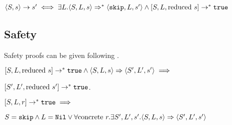 \begin{theorem}
$\langle S, s \rangle \to s' \iff \exists L. \langle S, L, s \rangle \Rightarrow ^{*} \langle \texttt{skip}, L, s' \rangle \land [ S, L, \text{reduced } s ] \to^{*} \texttt{true}$ 
\end{theorem}

\subsection{Safety}

Safety proofs can be given following \cite{wright1994syntactic}.

\begin{theorem}[Preservation]
$[ S, L, \text{reduced } s ] \to ^* \texttt{true} \land \langle S, L, s \rangle \Rightarrow \langle S', L', s' \rangle \implies$ 

$[ S', L', \text{reduced } s' ] \to ^* \texttt{true}$.
\end{theorem}

\begin{theorem}[Progress]
$[ S, L, r ] \to ^* \texttt{true} \implies$ 

$S = \texttt{skip} \land L = \texttt{Nil} \lor \forall \text{concrete } r. \exists S',L',s'. \langle S, L, s \rangle \Rightarrow \langle S', L', s' \rangle$ 
\end{theorem}

 


